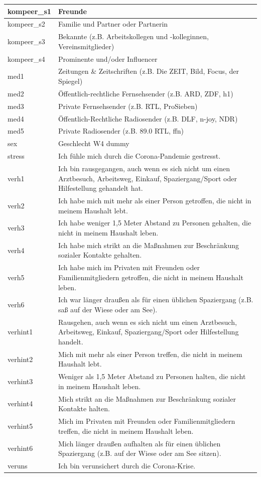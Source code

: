 \documentclass[]{book}
\begin{document}
\begin{tabular}{l|l}
\hline
kompeer\_s1 & Freunde\\
\hline
kompeer\_s2 & Familie und Partner oder Partnerin\\
\hline
kompeer\_s3 & Bekannte (z.B. Arbeitskollegen und -kolleginnen, Vereinsmitglieder)\\
\hline
kompeer\_s4 & Prominente und/oder Influencer\\
\hline
med1 & Zeitungen \& Zeitschriften (z.B. Die ZEIT, Bild, Focus, der Spiegel)\\
\hline
med2 & Öffentlich-rechtliche Fernsehsender (z.B. ARD, ZDF, h1)\\
\hline
med3 & Private Fernsehsender (z.B. RTL, ProSieben)\\
\hline
med4 & Öffentlich-Rechtliche Radiosender (z.B. DLF, n-joy, NDR)\\
\hline
med5 & Private Radiosender (z.B. 89.0 RTL, ffn)\\
\hline
sex & Geschlecht W4 dummy\\
\hline
stress & Ich fühle mich durch die Corona-Pandemie gestresst.\\
\hline
verh1 & Ich bin rausgegangen, auch wenn es sich nicht um einen Arztbesuch, Arbeitsweg, Einkauf, Spaziergang/Sport oder Hilfestellung gehandelt hat.\\
\hline
verh2 & Ich habe mich mit mehr als einer Person getroffen, die nicht in meinem Haushalt lebt.\\
\hline
verh3 & Ich habe weniger 1,5 Meter Abstand zu Personen gehalten, die nicht in meinem Haushalt leben.\\
\hline
verh4 & Ich habe mich strikt an die Maßnahmen zur Beschränkung sozialer Kontakte gehalten.\\
\hline
verh5 & Ich habe mich im Privaten mit Freunden oder Familienmitgliedern getroffen, die nicht in meinem Haushalt leben.\\
\hline
verh6 & Ich war länger draußen als für einen üblichen Spaziergang (z.B. saß auf der Wiese oder am See).\\
\hline
verhint1 & Rausgehen, auch wenn es sich nicht um einen Arztbesuch, Arbeitsweg, Einkauf, Spaziergang/Sport oder Hilfestellung handelt.\\
\hline
verhint2 & Mich mit mehr als einer Person treffen, die nicht in meinem Haushalt lebt.\\
\hline
verhint3 & Weniger als 1,5 Meter Abstand zu Personen halten, die nicht in meinem Haushalt leben.\\
\hline
verhint4 & Mich strikt an die Maßnahmen zur Beschränkung sozialer Kontakte halten.\\
\hline
verhint5 & Mich im Privaten mit Freunden oder Familienmitgliedern treffen, die nicht in meinem Haushalt leben.\\
\hline
verhint6 & Mich länger draußen aufhalten als für einen üblichen Spaziergang (z.B. auf der Wiese oder am See sitzen).\\
\hline
veruns & Ich bin verunsichert durch die Corona-Krise.\\
\hline
\end{tabular}
\end{document}
